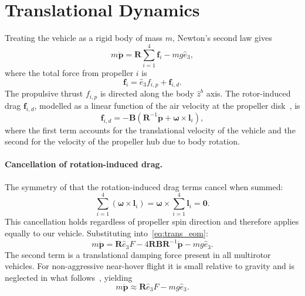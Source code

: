 \section{Translational Dynamics}
\label{sec:translational_dynamics}

Treating the vehicle as a rigid body of mass $m$, Newton's second law gives
\begin{equation}
    m\ddot{\boldsymbol{p}} = \boldsymbol{R}\sum_{i=1}^{4}\boldsymbol{f}_i
        - mg\hat{e}_3,
    \label{eq:trans_eom}
\end{equation}
where the total force from propeller $i$ is
\begin{equation}
    \boldsymbol{f}_i = \hat{e}_3 f_{i,p} + \boldsymbol{f}_{i,d}.
    \label{eq:prop_force}
\end{equation}
The propulsive thrust $f_{i,p}$ is directed along the body $\hat{z}^b$ axis.
The rotor-induced drag $\boldsymbol{f}_{i,d}$, modelled as a linear function
of the air velocity at the propeller disk~\cite{bai2022splitflyerair}, is
\begin{equation}
    \boldsymbol{f}_{i,d} = -\boldsymbol{B}
        \!\left(\boldsymbol{R}^{-1}\dot{\boldsymbol{p}}
        + \boldsymbol{\omega}\times\boldsymbol{l}_i\right),
    \label{eq:rotor_drag}
\end{equation}
where the first term accounts for the translational velocity of the vehicle
and the second for the velocity of the propeller hub due to body rotation.

\paragraph{Cancellation of rotation-induced drag.}
The symmetry of  that the rotation-induced
drag terms cancel when summed:
\begin{equation}
    \sum_{i=1}^{4}\left(\boldsymbol{\omega}\times\boldsymbol{l}_i\right)
        = \boldsymbol{\omega}\times\sum_{i=1}^{4}\boldsymbol{l}_i
        = \mathbf{0}.
    \label{eq:drag_cancel}
\end{equation}
This cancellation holds regardless of propeller spin direction and therefore
applies equally to our vehicle.  Substituting into~\eqref{eq:trans_eom}:
\begin{equation}
    m\ddot{\boldsymbol{p}}
        = \boldsymbol{R}\hat{e}_3 F
          - 4\boldsymbol{R}\boldsymbol{B}\boldsymbol{R}^{-1}\dot{\boldsymbol{p}}
          - mg\hat{e}_3.
    \label{eq:trans_full}
\end{equation}
The second term is a translational damping force present in all multirotor
vehicles.  For non-aggressive near-hover flight it is small relative to
gravity and is neglected in what follows~\cite{bai2022splitflyerair}, yielding
\begin{equation}
    m\ddot{\boldsymbol{p}} \approx \boldsymbol{R}\hat{e}_3 F - mg\hat{e}_3.
    \label{eq:trans_hover}
\end{equation}

